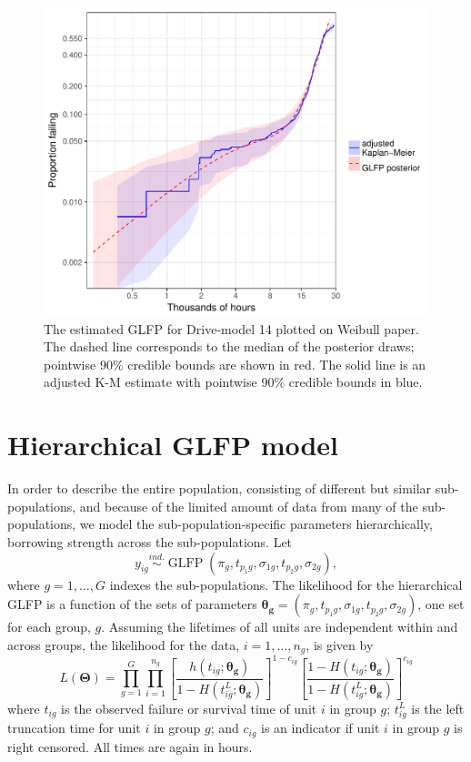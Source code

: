 \documentclass[12pt]{article}
\newcommand{\ind}{\stackrel{ind.}{\sim}}
\newcommand{\op}{\operatorname}
\begin{document}
\begin{figure}[H]
\centering
  \includegraphics[width=.8\textwidth]{km14-prob-plus}
  \caption{The estimated GLFP for Drive-model 14 plotted on Weibull paper.  The dashed line corresponds to the median of the posterior draws; pointwise 90\% credible bounds are shown in red.  The solid line is an adjusted K-M estimate with pointwise 90\% credible bounds in blue.}
  \label{ex1-overlay}
\end{figure}


\section{Hierarchical GLFP model}
\label{sec:Hierarchical GLFP model}

In order to describe the entire population, consisting of different but similar sub-populations, and because of the limited amount of data from many of the sub-populations, we model the sub-population-specific parameters hierarchically, borrowing strength across the sub-populations.  Let
\begin{equation}
y_{ig} \ind \op{GLFP}\left( \pi_g, t_{p_{1}g}, \sigma_{1g}, t_{p_{2}g}, \sigma_{2g} \right),
\end{equation}
where $g=1,\ldots,G$ indexes the sub-populations.  The likelihood for the hierarchical GLFP is a function of the sets of parameters $\bm{\theta_g} = (\pi_{g}, t_{p_{1}g}, \sigma_{1g}, t_{p_{2}g}, \sigma_{2g})$, one set for each group, $g$.  Assuming the lifetimes of all units are independent within and across groups, the likelihood for the data, $i=1,\dots,n_g$,  is given by
\begin{equation*}
L(\bm{\Theta})= \prod_{g=1}^{G} \prod_{i=1}^{n_{g}} \left[\frac{h(t_{ig};\bm{\theta_g})}{1-H(t_{ig}^L;\bm{\theta_g})}\right]^{1-c_{ig}} \left[ \frac{1-H(t_{ig};\bm{\theta_g})}{1-H(t_{ig}^L;\bm{\theta_g})} \right]^{c_{ig}}
\end{equation*}
where $t_{ig}$ is the observed failure or survival time of unit $i$ in group $g$; $t_{ig}^L$ is the left truncation time for unit $i$ in group $g$; and $c_{ig}$ is an indicator if unit $i$ in group $g$ is right censored.  All times are again in hours.
\end{document}
